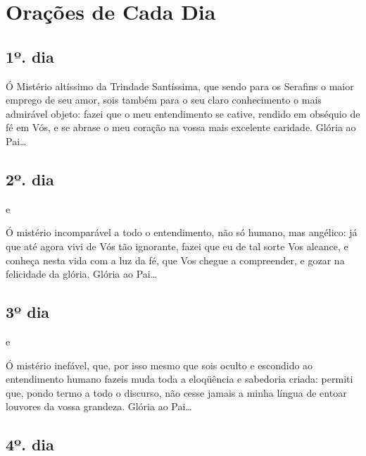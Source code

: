 \documentclass[18pt]{article}
\begin{document}

\newpage

\section{Orações de Cada Dia}


\subsection*{1º. dia}


Ó Mistério altíssimo da Trindade Santíssima, que sendo para os Serafins o maior emprego de seu amor, sois também para o seu claro conhecimento o mais admirável objeto: fazei que o meu entendimento se cative, rendido em obséquio de fé em Vós, e se abrase o meu coração na vossa mais excelente caridade.
Glória ao Pai…

\textbf{}


\subsection*{2º. dia}

\textbf{} e  \textbf{} 

Ó mistério incomparável a todo o entendimento, não só humano, mas angélico: já que até agora vivi de Vós tão ignorante, fazei que eu de tal sorte Vos alcance, e conheça nesta vida com a luz da fé, que Vos chegue a compreender, e gozar na felicidade da glória.
Glória ao Pai…

\textbf{}

\subsection*{3º dia}

\textbf{} e  \textbf{} 

Ó mistério inefável, que, por isso mesmo que sois oculto e escondido ao entendimento humano fazeis muda toda a eloqüência e sabedoria criada: permiti que, pondo termo a todo o discurso, não cesse jamais a minha língua de entoar louvores da vossa grandeza.
Glória ao Pai…

\textbf{}

\subsection*{4º. dia}
\end{document}
